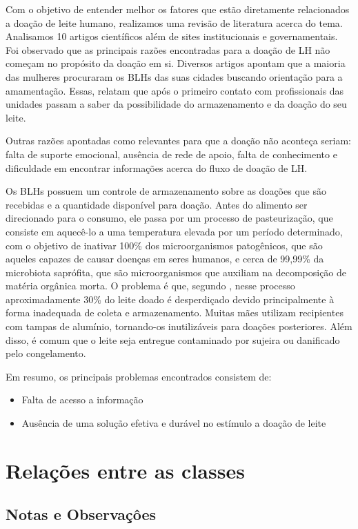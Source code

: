 Com o objetivo de entender melhor os fatores que estão diretamente relacionados a doação de leite humano, realizamos uma revisão de literatura acerca do tema. Analisamos 10 artigos científicos além de sites institucionais e governamentais. Foi observado que as principais razões encontradas para a doação de LH não começam no propósito da doação em si. Diversos artigos apontam que a maioria das mulheres procuraram os BLHs das suas cidades buscando orientação para a amamentação. Essas, relatam que após o primeiro contato com profissionais das unidades passam a saber da possibilidade do armazenamento e da doação do seu leite. 

Outras razões apontadas como relevantes para que a doação não aconteça seriam: falta de suporte emocional, ausência de rede de apoio, falta de conhecimento e dificuldade em encontrar informações acerca do fluxo de doação de LH.

Os BLHs possuem um controle de armazenamento sobre as doações que são recebidas e a quantidade disponível para doação. Antes do alimento ser direcionado para o consumo, ele passa por um processo de pasteurização, que consiste em aquecê-lo a uma temperatura elevada por um período determinado, com o objetivo de inativar 100\% dos microorganismos patogênicos, que são aqueles capazes de causar doenças em seres humanos, e cerca de 99,99\% da microbiota saprófita, que são microorganismos que auxiliam na decomposição de matéria orgânica morta. O problema é que, segundo \cite{RedeBLH}, nesse processo aproximadamente 30\% do leite doado é desperdiçado devido principalmente à forma inadequada de coleta e armazenamento. Muitas mães utilizam recipientes com tampas de alumínio, tornando-os inutilizáveis para doações posteriores. Além disso, é comum que o leite seja entregue contaminado por sujeira ou danificado pelo congelamento.

Em resumo, os principais problemas encontrados consistem de: 
\begin{itemize}
    \item Falta de acesso a informação
    \item Ausência de uma solução efetiva e durável no estímulo a doação de leite
\end{itemize} 

\section{Relações entre as classes}

\subsection{Notas e Observaçôes}

